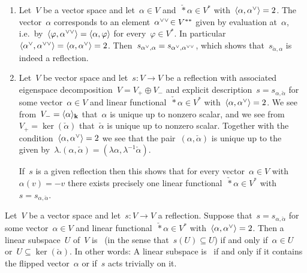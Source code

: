 \begin{remark}
  \label{regarding general reflections}
  \leavevmode
  \begin{enumerate}
    \item
      Let~$V$ be a vector space and let~$\alpha \in V$ and~$\check*{\alpha} \in V^*$ with~$\pair{\alpha, \check{\alpha}} = 2$.
      The vector~$\alpha$ corresponds to an element~$\dcheck*{\alpha} \in V^{**}$ given by evaluation at~$\alpha$, i.e.\ by~$\pair{\varphi, \dcheck{\alpha}} = \pair{\alpha, \varphi}$ for every~$\varphi \in V^*$.
      In particular~$\pair{\check{\alpha}, \dcheck{\alpha}} = \pair{\alpha, \check{\alpha}} = 2$.
      Then~$s_{\check{\alpha}, \alpha} = s_{\check{\alpha}, \dcheck{\alpha}}$, which shows that~$s_{\check{\alpha}, \alpha}$ is indeed a reflection.
    \item
      \label{uniqueness of reflection parametrization}
      Let~$V$ be vector space and let~$s \colon V \to V$ be a reflection with associated eigenspace decomposition~$V = V_+ \oplus V_-$ and explicit description~$s = s_{\alpha, \check{\alpha}}$ for some vector~$\alpha \in V$ and linear functional~$\check*{\alpha} \in V^*$ with~$\pair{\alpha, \check{\alpha}} = 2$.
      We see from~$V_- = \langle\alpha\rangle_{\mathbf{k}}$ that~$\alpha$ is unique up to nonzero scalar, and we see from~$V_+ = \ker(\check{\alpha})$ that~$\check{\alpha}$ is unique up to nonzero scalar.
      Together with the condition~$\pair{\alpha, \check{\alpha}} = 2$ we see that the pair~$(\alpha, \check{\alpha})$ is unique up to the~{\action{$\kf^{\times}$}} given by~$\lambda.(\alpha, \check{\alpha}) = (\lambda \alpha, \lambda^{-1} \check{\alpha})$.
      
      If~$s$ is a given reflection then this shows that for every vector~$\alpha \in V$ with~$\alpha(v) = -v$ there exists precisely one linear functional~$\check*{\alpha} \in V^*$ with~$s = s_{\alpha, \check{\alpha}}$.
  \end{enumerate}
\end{remark}


\begin{lemma}
  \label{subspaces invariant under reflection}
  Let~$V$ be a vector space and let~$s \colon V \to V$ a reflection.
  Suppose that~$s = s_{\alpha, \check{\alpha}}$ for some vector~$\alpha \in V$ and linear functional~$\check*{\alpha} \in V^*$ with~$\pair{\alpha, \check{\alpha}} = 2$.
  Then a linear subspace~$U$ of~$V$ is~{} (in the sense that~$s(U) \subseteq U$) if and only if~$\alpha \in U$ or~$U \subseteq \ker(\check{\alpha})$.
  In other words:
  A linear subspace is~{} if and only if it contains the flipped vector~$\alpha$ or if~$s$ acts trivially on it.
\end{lemma}


